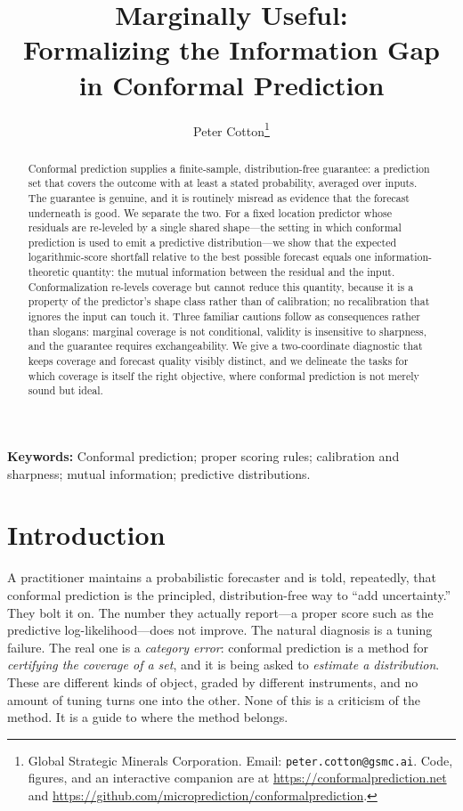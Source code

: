 \documentclass[11pt]{article}
\title{Marginally Useful:\\ Formalizing the Information Gap in Conformal Prediction}
\author{}
\author{Peter Cotton\thanks{Global Strategic Minerals Corporation.
    Email: \texttt{peter.cotton@gsmc.ai}. Code, figures, and an interactive
    companion are at \url{https://conformalprediction.net} and
    \url{https://github.com/microprediction/conformalprediction}.}}
\date{}
\theoremstyle{definition}
\begin{document}
\doublespacing
\maketitle

\begin{abstract}
\noindent
Conformal prediction supplies a finite-sample, distribution-free guarantee: a prediction
set that covers the outcome with at least a stated probability, averaged over inputs. The
guarantee is genuine, and it is routinely misread as evidence that the forecast underneath
is good. We separate the two. For a fixed location predictor whose residuals are
re-leveled by a single shared shape---the setting in which conformal prediction is used to
emit a predictive distribution---we show that the expected logarithmic-score shortfall
relative to the best possible forecast equals one information-theoretic quantity: the
mutual information between the residual and the input. Conformalization re-levels coverage
but cannot reduce this quantity, because it is a property of the predictor's shape class
rather than of calibration; no recalibration that ignores the input can touch it. Three
familiar cautions follow as consequences rather than slogans: marginal coverage is not
conditional, validity is insensitive to sharpness, and the guarantee requires
exchangeability. We give a two-coordinate diagnostic that keeps coverage and forecast
quality visibly distinct, and we delineate the tasks for which coverage is itself the
right objective, where conformal prediction is not merely sound but ideal.
\end{abstract}

\noindent\textbf{Keywords:} Conformal prediction; proper scoring rules; calibration and
sharpness; mutual information; predictive distributions.

\section{Introduction}

A practitioner maintains a probabilistic forecaster and is told, repeatedly, that
conformal prediction is the principled, distribution-free way to ``add uncertainty.'' They
bolt it on. The number they actually report---a proper score such as the predictive
log-likelihood---does not improve. The natural diagnosis is a tuning failure. The real one
is a \emph{category error}: conformal prediction is a method for \emph{certifying the
coverage of a set}, and it is being asked to \emph{estimate a distribution}. These are
different kinds of object, graded by different instruments, and no amount of tuning turns
one into the other. None of this is a criticism of the method. It is a guide to where the
method belongs.
\end{document}
